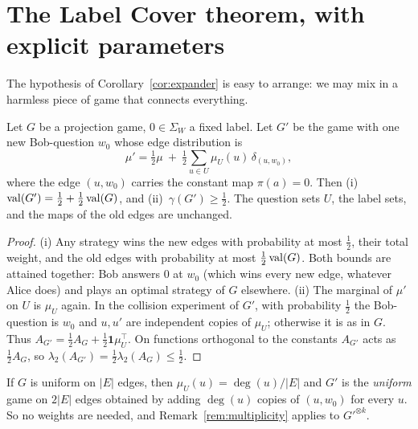 \section{The Label Cover theorem, with explicit parameters}
\label{sec:lc}

The hypothesis of Corollary~\ref{cor:expander} is easy to arrange: we may mix in a harmless piece of game that connects everything.

\begin{lemma}\label{lem:mix}
Let $G$ be a projection game, $0\in\Sigma_W$ a fixed label.  Let $G'$ be the game with one new Bob-question $w_0$ whose edge distribution is
\[
  \mu'=\tfrac12\mu\ +\ \tfrac12\sum_{u\in U}\mu_U(u)\,\delta_{(u,w_0)},
\]
where the edge $(u,w_0)$ carries the constant map $\pi(a)=0$.  Then (i)~$\operatorname{val}(G')=\frac12+\frac12\operatorname{val}(G)$, and (ii)~$\gamma(G')\ge\frac12$.  The question sets $U$, the label sets, and the maps of the old edges are unchanged.
\end{lemma}
\begin{proof}
(i) Any strategy wins the new edges with probability at most $\frac12$, their total weight, and the old edges with probability at most $\frac12\operatorname{val}(G)$.  Both bounds are attained together: Bob answers $0$ at $w_0$ (which wins every new edge, whatever Alice does) and plays an optimal strategy of $G$ elsewhere.
(ii) The marginal of $\mu'$ on $U$ is $\mu_U$ again.  In the collision experiment of $G'$, with probability $\frac12$ the Bob-question is $w_0$ and $u,u'$ are independent copies of $\mu_U$; otherwise it is as in $G$.  Thus $A_{G'}=\frac12A_G+\frac12\mathbf 1\mu_U^\top$.  On functions orthogonal to the constants $A_{G'}$ acts as $\frac12A_G$, so $\lambda_2(A_{G'})=\frac12\lambda_2(A_G)\le\frac12$.
\end{proof}

\begin{remark}[Uniformity]
If $G$ is uniform on $|E|$ edges, then $\mu_U(u)=\deg(u)/|E|$ and $G'$ is the \emph{uniform} game on $2|E|$ edges obtained by adding $\deg(u)$ copies of $(u,w_0)$ for every $u$.  So no weights are needed, and Remark~\ref{rem:multiplicity} applies to $G'^{\otimes k}$.
\end{remark}

